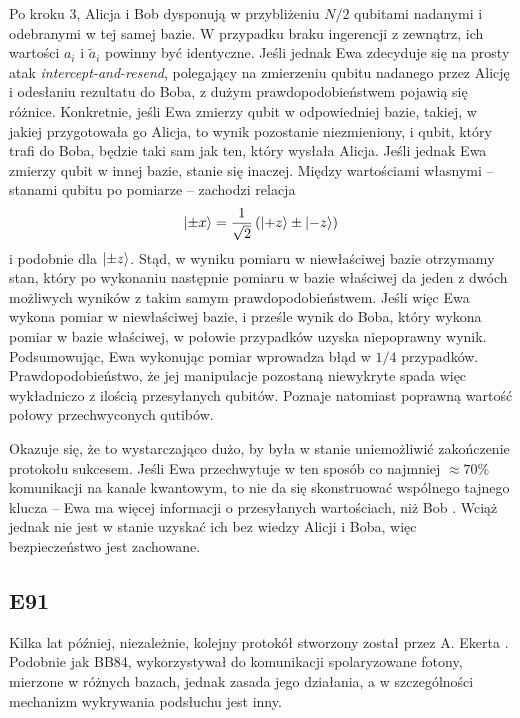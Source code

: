 \documentclass[10pt]{article}
\begin{document}
Po kroku 3, Alicja i Bob dysponują w przybliżeniu \(N/2\) qubitami nadanymi i odebranymi w tej samej
bazie. W przypadku braku ingerencji z zewnątrz, ich wartości \(a_i\) i \(\tilde{a}_i\) powinny być
identyczne. Jeśli jednak Ewa zdecyduje się na prosty atak \emph{intercept-and-resend}, polegający
na zmierzeniu qubitu nadanego przez Alicję i odesłaniu rezultatu do Boba, z dużym prawdopodobieństwem
pojawią się różnice. Konkretnie, jeśli Ewa zmierzy qubit w odpowiedniej bazie, takiej, w jakiej
przygotowała go Alicja, to wynik pozostanie niezmieniony, i qubit, który trafi do Boba, będzie taki
sam jak ten, który wysłała Alicja. Jeśli jednak Ewa zmierzy qubit w innej bazie, stanie się inaczej.
Między wartościami własnymi -- stanami qubitu po pomiarze -- zachodzi relacja
\[
\Ket{\pm x}=\frac{1}{\sqrt{2}}\left(\Ket{+z}\pm\Ket{-z}\right)
\]
i podobnie dla \(\Ket{\pm z}\). Stąd, w wyniku pomiaru w niewłaściwej bazie otrzymamy stan, który
po wykonaniu następnie pomiaru w bazie właściwej da jeden z dwóch możliwych wyników z takim samym
prawdopodobieństwem. Jeśli więc Ewa wykona pomiar w niewłaściwej bazie, i prześle wynik do Boba,
który wykona pomiar w bazie właściwej, w połowie przypadków uzyska niepoprawny wynik. Podsumowując,
Ewa wykonując pomiar wprowadza błąd w \(1/4\) przypadków. Prawdopodobieństwo, że jej manipulacje
pozostaną niewykryte spada więc wykładniczo z ilością przesyłanych qubitów. Poznaje natomiast 
poprawną wartość połowy przechwyconych qutibów. 

Okazuje się, że to wystarczająco dużo, by była w stanie uniemożliwić zakończenie protokołu sukcesem.
Jeśli Ewa przechwytuje w ten sposób co najmniej \(\approx 70\%\) komunikacji na kanale kwantowym, to 
nie da się skonstruować wspólnego tajnego klucza -- Ewa ma więcej informacji o przesyłanych wartościach, 
niż Bob \cite{Csiszar78,Scarani09}. Wciąż jednak nie jest w stanie uzyskać ich bez wiedzy Alicji
i Boba, więc bezpieczeństwo jest zachowane.

\subsection{E91}

Kilka lat później, niezależnie, kolejny protokół stworzony został przez A. Ekerta \cite{Ekert91,Ekert12}.
Podobnie jak BB84, wykorzystywał do komunikacji spolaryzowane fotony, mierzone w różnych bazach,
jednak zasada jego działania, a w szczególności mechanizm wykrywania podsłuchu jest inny.
\end{document}
